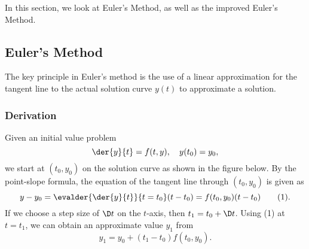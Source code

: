 In this section, we look at Euler's Method, as well as the improved Euler's Method.

\subsection{Euler's Method}

The key principle in Euler's method is the use of a linear approximation for the tangent line to the actual solution curve $y(t)$ to approximate a solution.

\subsubsection{Derivation}

Given an initial value problem \[\der{y}{t} = f(t, y), \quad y(t_0) = y_0,\] we start at $(t_0, y_0)$ on the solution curve as shown in the figure below. By the point-slope formula, the equation of the tangent line through $(t_0, y_0)$ is given as \[y - y_0 = \evalder{\der{y}{t}}{t=t_0} (t - t_0) = f(t_0, y_0) (t - t_0) \tag{1}.\] If we choose a step size of $\D t$ on the $t$-axis, then $t_1 = t_0 + \D t$. Using (1) at $t = t_1$, we can obtain an approximate value $y_1$ from \[y_1 = y_0 + (t_1 - t_0) f(t_0, y_0) \tag{2}.\] 

\begin{figure}[H]
    \centering
    \caption{}
\end{figure}

